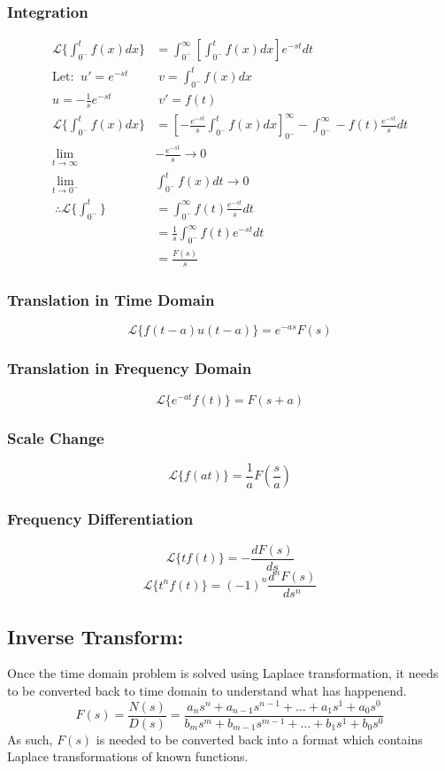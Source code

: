 \documentclass[a5paper]{article}
\newcommand{\Lap}{\mathcal{L}}
\begin{document}
	\subsubsection{Integration}
	\begin{align*}
		\Lap\{\int^{t}_{0^{-}}f(x)dx\}&=\int^{\infty}_{0^{-}}[\int^{t}_{0^{-}}f(x)dx]e^{-st}dt\\
		\text{Let:}\;\;u'=e^{-st}\;&\;v=\int^{t}_{0^{-}}f(x)dx\\
		u=-\frac{1}{s}e^{-st}\;&\;v'=f(t)\\
		\Lap\{\int^{t}_{0^{-}}f(x)dx\}&=[-\frac{e^{-st}}{s}\int^{t}_{0^{-}}f(x)dx]^{\infty}_{0^{-}}-\int^{\infty}_{0^{-}}-f(t)\frac{e^{-st}}{s}dt\\
		\lim_{t\to\infty}&-\frac{e^{-st}}{s}\to0\\
		\lim_{t\to0^{-}}&\int^{t}_{0^{-}}f(x)dt\to0\\\
		\therefore\Lap\{\int^{t}_{0^-}\}&=\int^{\infty}_{0^{-}}f(t)\frac{e^{-st}}{s}dt\\
		&=\frac{1}{s}\int^{\infty}_{0^{-}}f(t)e^{-st}dt\\
		&=\frac{F(s)}{s}
	\end{align*}
	\subsubsection{Translation in Time Domain}
	$$\Lap\{f(t-a)u(t-a)\}=e^{-as}F(s)$$
	\subsubsection{Translation in Frequency Domain}
	$$\Lap\{e^{-at}f(t)\}=F(s+a)$$
	\subsubsection{Scale Change}
	$$\Lap\{f(at)\}=\frac{1}{a}F(\frac{s}{a})$$
	\subsubsection{Frequency Differentiation}
	$$\Lap\{tf(t)\}=-\frac{dF(s)}{ds}$$
	$$\Lap\{t^{n}f(t)\}=(-1)^{n}\frac{d^{n}F(s)}{ds^{n}}$$
	\subsection{Inverse Transform:}
	Once the time domain problem is solved using Laplace transformation, it needs to be converted back to time domain to understand what has happenend.
	$$F(s)=\frac{N(s)}{D(s)}=\frac{a_{n}s^{n}+a_{n-1}s^{n-1}+\ldots+a_{1}s^{1}+a_{0}s^{0}}{b_{m}s^{m}+b_{m-1}s^{m-1}+\ldots+b_{1}s^{1}+b_{0}s^{0}}$$
	As such, $F(s)$ is needed to be converted back into a format which contains Laplace transformations of known functions.
\end{document}
